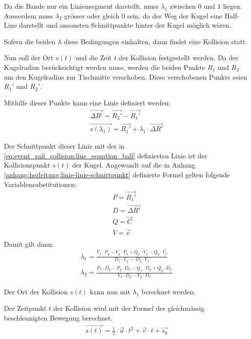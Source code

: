 Da die Bande nur ein Liniensegment darstellt, muss $\lambda_1$ zwischen $0$ und $1$ liegen.
Ausserdem muss $\lambda_2$ grösser oder gleich $0$ sein, da der Weg der Kugel eine Half-Line darstellt und ansonsten
Schnittpunkte hinter der Kugel möglich wären.

Sofern die beiden $\lambda$ diese Bedingungen einhalten, dann findet eine Kollision statt.

Nun soll der Ort $s(t)$ und die Zeit $t$ der Kollision
festgestellt werden. Da der Kugelradius berücksichtigt werden muss,
werden die beiden Punkte $R_1$ und $R_2$ um den Kugelradius zur Tischmitte verschoben.
Diese verschobenen Punkte seien $R_1'$ und $R_2'$.

Mithilfe dieser Punkte kann eine Linie definiert werden:
\begin{align}
    \vec{\Delta R'} = \vec{R_2'} - \vec{R_1'}\\
    \vec{s(\lambda_1)} = \vec{R_1'} + \lambda_1 \cdot \vec{\Delta R'}
\end{align}

Der Schnittpunkt dieser Linie mit der in \ref{eq:event_rail_collision:line_equation_ball} definierten Linie ist
der Kollisionspunkt $s(t)$ der Kugel.
Angewandt auf die in Anhang \ref{anhang:herleitung:linie-linie-schnittpunkt} definierte Formel gelten folgende
Variablensubstitutionen:
\begin{align}
    P = \vec{R_1'}\\
    D = \vec{\Delta R'}\\
    Q = \vec{C}\\
    V = \vec{v}\\
\end{align}
Damit gilt dann:
\begin{align}
    \lambda_1 = \frac{V_x \cdot P_y - V_y \cdot P_x + Q_x \cdot V_y - Q_y \cdot V_x}{D_x \cdot V_y - \cdot D_y \cdot V_x}\\
    \lambda_2 = \frac{P_x \cdot D_y - P_y \cdot D_x - Q_x \cdot D_y + Q_y \cdot D_x}{V_x \cdot D_y - V_y \cdot D_x}
\end{align}

Der Ort der Kollision $s(t)$ kann nun mit $\lambda_1$ berechnet werden.

Der Zeitpunkt $t$ der Kollision wird mit der Formel der gleichmässig beschleunigten Bewegung berechnet.
\begin{align}
    \vec{s(t)} = \frac{1}{2} \cdot \vec{a} \cdot t^2 + \vec{v} \cdot t + \vec{s_0}
\end{align}

